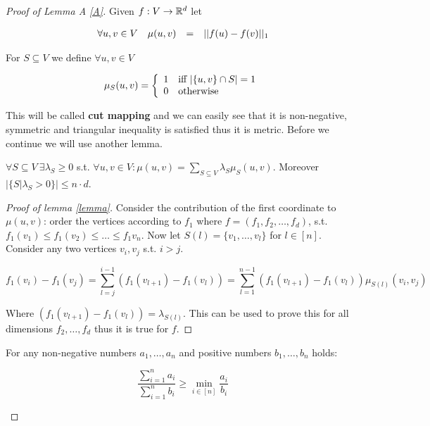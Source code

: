 \begin{proof}[Proof of Lemma A \ref{A}]
	Given $f: V \to \mathbb{R}^{d}$ let
	
	$$
	\begin{array}{l r c l}
		\forall u,v \in V & \mu (u,v) & = & ||f(u) - f(v)||_{1}
	\end{array}
	$$
	
	For $S \subseteq V$ we define $\forall u,v \in V$
	
	$$
	\mu_{S}(u,v) =
	\left\{
	\begin{array}{l l}
		1 & \text{iff } |\{u,v\} \cap S| = 1 \\
		0 & \text{otherwise}
	\end{array}
	\right.
	$$
	
	This will be called \textbf{cut mapping} and we can easily see that it is non-negative, symmetric and triangular inequality is satisfied thus it is metric. Before we continue we will use another lemma.
	
	\begin{lemma}[lemma]\label{lemma}
		$\forall S \subseteq V \ \exists \lambda_{S} \geq 0$ s.t. $\forall u,v \in V: \mu(u,v) = \sum_{S \subseteq V} \lambda_{S} \mu_{S}(u,v)$. Moreover $|\{S | \lambda_{S} > 0\}| \leq n \cdot d$.
	\end{lemma}
	
	\begin{proof}[Proof of lemma \ref{lemma}]
		Consider the contribution of the first coordinate to $\mu(u,v)$: order the vertices according to $f_{1}$ where $f = (f_{1}, f_{2}, \dots, f_{d})$, s.t. $f_{1}(v_{1}) \leq f_{1}(v_{2}) \leq \dots \leq f_{1}v_{n}$. Now let $S(l) = \{v_{1}, \dots, v_{l}\}$ for $l \in [n]$. Consider any two vertices $v_{i},v_{j}$ s.t. $i > j$.
		
		$$
		f_{1}(v_{i}) - f_{1}(v_{j}) = \sum_{l=j}^{i-1} (f_{1}(v_{l+1}) - f_{1}(v_{l})) = \sum_{l = 1}^{n-1} (f_{1}(v_{l+1}) - f_{1}(v_{l})) \mu_{S(l)} (v_{i}, v_{j}) 
		$$
		
		Where $(f_{1}(v_{l+1}) - f_{1}(v_{l})) = \lambda_{S(l)}$. This can be used to prove this for all dimensions $f_{2}, \dots, f_{d}$ thus it is true for $f$.
	\end{proof}
	
	\begin{observ}
		For any non-negative numbers $a_{1}, \dots, a_{n}$ and positive numbers $b_{1}, \dots, b_{n}$ holds:
		
		$$
		\frac{\sum_{i = 1}^{n} a_{i}}{\sum_{i = 1}^{n} b_{i}} \geq \min_{i \in [n]} \frac{a_{i}}{b_{i}}
		$$
	\end{observ}
	

\end{proof}
